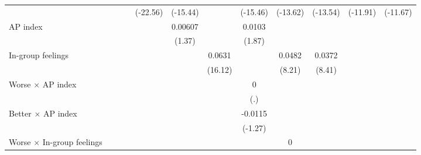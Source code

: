 {\begin{tabular}{l*{11}{c}}
                &                  &                  &                  & (-22.56)         & (-15.44)         &                  & (-15.46)         & (-13.62)         & (-13.54)         & (-11.91)         & (-11.67)         \\
AP index        &                  &                  &                  &                  &  0.00607         &                  &   0.0103         &                  &                  &                  &                  \\
                &                  &                  &                  &                  &   (1.37)         &                  &   (1.87)         &                  &                  &                  &                  \\
In-group feelings&                  &                  &                  &                  &                  &   0.0631\sym{***}&                  &   0.0482\sym{***}&   0.0372\sym{***}&                  &                  \\
                &                  &                  &                  &                  &                  &  (16.12)         &                  &   (8.21)         &   (8.41)         &                  &                  \\
Worse $\times$ AP index&                  &                  &                  &                  &                  &                  &        0         &                  &                  &                  &                  \\
                &                  &                  &                  &                  &                  &                  &      (.)         &                  &                  &                  &                  \\
Better $\times$ AP index&                  &                  &                  &                  &                  &                  &  -0.0115         &                  &                  &                  &                  \\
                &                  &                  &                  &                  &                  &                  &  (-1.27)         &                  &                  &                  &                  \\
Worse $\times$ In-group feelings&                  &                  &                  &                  &                  &                  &                  &        0         &                  &                  &                  \\

\end{tabular}}
